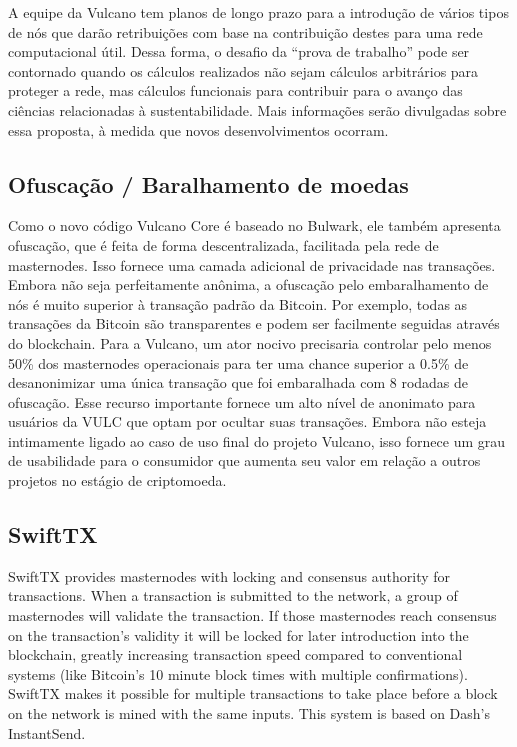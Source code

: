 \documentclass[A4paper, 12pt]{article}
\begin{document}
A equipe da Vulcano tem planos de longo prazo para a introdução de vários tipos de nós que darão retribuições com base na contribuição destes para uma rede computacional útil. Dessa forma, o desafio da “prova de trabalho” pode ser contornado quando os cálculos realizados não sejam cálculos arbitrários para proteger a rede, mas cálculos funcionais para contribuir para o avanço das ciências relacionadas à sustentabilidade. Mais informações serão divulgadas sobre essa proposta, à medida que novos desenvolvimentos ocorram.

\subsection{Ofuscação / Baralhamento de moedas}
Como o novo código Vulcano Core é baseado no Bulwark, ele também apresenta ofuscação, que é feita de forma descentralizada, facilitada pela rede de masternodes. Isso fornece uma camada adicional de privacidade nas transações. Embora não seja perfeitamente anônima, a ofuscação pelo embaralhamento de nós é muito superior à transação padrão da Bitcoin.  Por exemplo, todas as transações da Bitcoin são transparentes e podem ser facilmente seguidas através do blockchain. Para a Vulcano, um ator nocivo precisaria controlar pelo menos 50\% dos masternodes operacionais para ter uma chance superior a 0.5\% de desanonimizar uma única transação que foi embaralhada com 8 rodadas de ofuscação. Esse recurso importante fornece um alto nível de anonimato para usuários da VULC que optam por ocultar suas transações.   Embora não esteja intimamente ligado ao caso de uso final do projeto Vulcano, isso fornece um grau de usabilidade para o consumidor que aumenta seu valor em relação a outros projetos no estágio de criptomoeda.

\subsection{SwiftTX}
SwiftTX provides masternodes with locking and consensus authority for transactions. When a transaction is submitted to the network, a group of masternodes will validate the transaction. If those masternodes reach consensus on the transaction’s validity it will be locked for later introduction into the blockchain, greatly increasing transaction speed compared to conventional systems (like Bitcoin’s 10 minute block times with multiple confirmations). SwiftTX makes it possible for multiple transactions to take place before a block on the network is mined with the same inputs. This system is based on Dash’s InstantSend.
\end{document}
